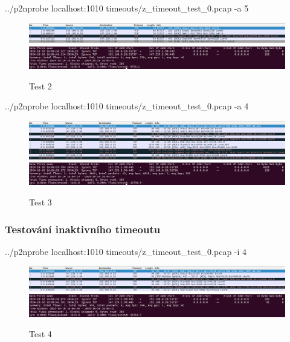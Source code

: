 \documentclass[11pt, a4paper, hidelinks]{article}[08.10.2023]
\begin{document}
    \begin{center}
        ../p2nprobe localhost:1010 timeouts/z\_timeout\_test\_0.pcap -a 5
    \end{center}
    \vspace{1cm}
    \begin{figure}[ht]
        \centering
        \includegraphics[width=1\linewidth]{pictures/test_2_data.png}
        \includegraphics[width=1\linewidth]{pictures/test_2_res.png}
        \caption{Test 2}
    \end{figure}

    \begin{center}
        ../p2nprobe localhost:1010 timeouts/z\_timeout\_test\_0.pcap -a 4
    \end{center}
    \vspace{1cm}
    \begin{figure}[ht]
        \centering
        \includegraphics[width=1\linewidth]{pictures/test_3_data.png}
        \includegraphics[width=1\linewidth]{pictures/test_3_res.png}
        \caption{Test 3}
    \end{figure}

    \pagebreak
    \subsubsection{Testování inaktivního timeoutu}
    \begin{center}
        ../p2nprobe localhost:1010 timeouts/z\_timeout\_test\_0.pcap -i 4
    \end{center}
    \begin{figure}[ht]
        \centering
        \includegraphics[width=1\linewidth]{pictures/test_4_data.png}
        \includegraphics[width=1\linewidth]{pictures/test_4_res.png}
        \caption{Test 4}
    \end{figure}
\end{document}
